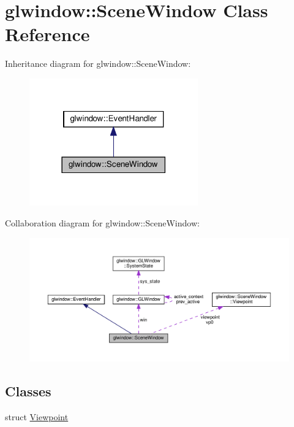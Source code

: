 \hypertarget{classglwindow_1_1_scene_window}{}\section{glwindow\+:\+:Scene\+Window Class Reference}
\label{classglwindow_1_1_scene_window}


Inheritance diagram for glwindow\+:\+:Scene\+Window\+:
\nopagebreak
\begin{figure}[H]
\begin{center}
\leavevmode
\includegraphics[width=206pt]{classglwindow_1_1_scene_window__inherit__graph}
\end{center}
\end{figure}


Collaboration diagram for glwindow\+:\+:Scene\+Window\+:
\nopagebreak
\begin{figure}[H]
\begin{center}
\leavevmode
\includegraphics[width=350pt]{classglwindow_1_1_scene_window__coll__graph}
\end{center}
\end{figure}
\subsection*{Classes}
\begin{DoxyCompactItemize}
\item 
struct \hyperlink{structglwindow_1_1_scene_window_1_1_viewpoint}{Viewpoint}
\end{DoxyCompactItemize}
